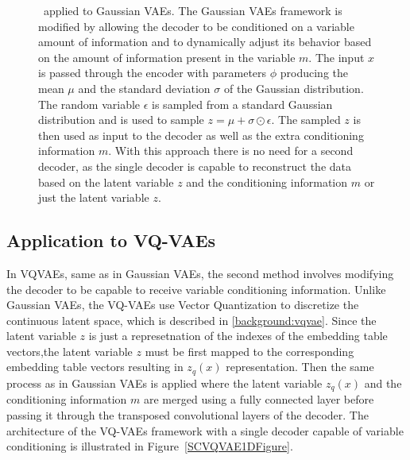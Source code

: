 \begin{figure}[H]
    \centering
    
    \caption[ applied to Gaussian VAEs.]%
    {
        \methodTwo\ applied to Gaussian VAEs. The Gaussian VAEs framework is modified by allowing the decoder to be conditioned on a variable amount of information and to dynamically adjust its behavior based on the amount of information present in the variable $m$. The input $x$ is passed through the encoder with parameters $\phi$ producing the mean $\mu$ and the standard deviation $\sigma$ of the Gaussian distribution. The random variable $\epsilon$ is sampled from a standard Gaussian distribution and is used to sample $ z = \mu + \sigma \odot \epsilon$. The sampled $z$ is then used as input to the decoder as well as the extra conditioning information $m$. With this approach there is no need for a second decoder, as the single decoder is capable to reconstruct the data based on the latent variable $z$ and the conditioning information $m$ or just the latent variable $z$.
    }\label{SCVAE1DFigure}
\end{figure}

\subsection{Application to VQ-VAEs}

In VQVAEs, same as in Gaussian VAEs, the second method involves modifying the
decoder to be capable to receive variable conditioning information. Unlike
Gaussian VAEs, the VQ-VAEs use Vector Quantization to discretize the continuous 
latent space, which is described in \autoref{background:vqvae}. Since the latent
variable $z$ is just a represetnation of the indexes of the embedding table vectors,the latent variable $z$ must be first mapped to the corresponding embedding table vectors resulting in $z_q(x)$ representation. Then the same process as in Gaussian VAEs is applied where the latent variable $z_q(x)$ and the conditioning information $m$ are merged using a fully connected layer before passing it through the transposed convolutional layers of the decoder. The architecture of the VQ-VAEs framework with a single decoder capable of
variable conditioning is illustrated in Figure~\ref{SCVQVAE1DFigure}.

